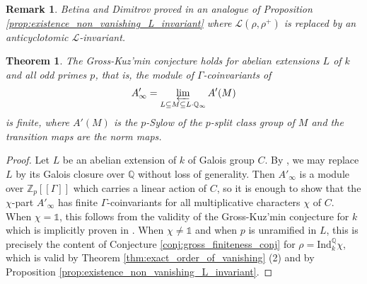 \documentclass[12pt]{amsart}
\newcommand\bQ{\mathbb{Q}}
\newcommand\Zp{{\mathbb{Z}_p}}
\newcommand\cL{\mathcal{L}}
\newcommand{\Ind}{\mathrm{Ind}}
\theoremstyle{defstyle}
\newtheorem{remark}[subsubsection]{Remark}
\theoremstyle{thmstyle}
\newtheorem{theorem}[subsubsection]{Theorem}
\begin{document}
\begin{remark}
	Betina and Dimitrov proved in \cite[Proposition 1.11]{betinadimitrovKatz} an analogue of Proposition \ref{prop:existence_non_vanishing_L_invariant} where $\cL(\rho,\rho^+)$ is replaced by an \emph{anticyclotomic} $\cL$-invariant.
\end{remark}
 
 \begin{theorem}\label{thm:gross_kuzmin}
 	The Gross-Kuz'min conjecture holds for abelian extensions $L$ of $k$ and all odd primes $p$, that is, the module of $\Gamma$-coinvariants of 
 	$$A'_\infty=\varprojlim_{L\subseteq M \subseteq L\cdot \bQ_\infty}A'(M)$$
 	is finite, where $A'(M)$ is the $p$-Sylow of the $p$-split class group of $M$ and  the transition maps are the norm maps.
 \end{theorem}
\begin{proof}
Let $L$ be an abelian extension of $k$ of Galois group $C$. By \cite[p.3, Remarque]{jaulent2003}, we may replace $L$ by its Galois closure over $\bQ$ without loss of generality. Then $A'_\infty$ is a module over $\Zp[[\Gamma]]$ which carries a linear action of $C$, so it is enough to show that the $\chi$-part $A'_\infty$ has finite $\Gamma$-coinvariants for all multiplicative characters $\chi$ of $C$. When $\chi=\mathds{1}$, this follows from the validity of the Gross-Kuz'min conjecture for $k$ which is implicitly proven in \cite{greenberg1973}. When $\chi\neq \mathds{1}$ and when $p$ is unramified in $L$, this is precisely the content of Conjecture \ref{conj:gross_finiteness_conj} for $\rho=\Ind_k^\bQ \chi$, which is valid by Theorem \ref{thm:exact_order_of_vanishing} (2) and by Proposition \ref{prop:existence_non_vanishing_L_invariant}. 


\end{proof}
\end{document}
